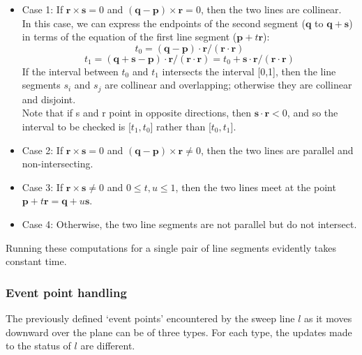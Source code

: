 \documentclass{article}
\begin{document}
\begin{itemize}
    \item Case 1: If $\mathbf{r} \times \mathbf{s} = 0$ and $(\mathbf{q} - \mathbf{p}) \times \mathbf{r} = 0$, then the two lines are collinear.\\
    In this case, we can express the endpoints of the second segment ($\mathbf{q}$ to $\mathbf{q}+\mathbf{s}$) in terms of the equation of the first line segment ($\mathbf{p} + t\mathbf{r}$):
    \begin{equation*}
        t_0 = (\mathbf{q} - \mathbf{p}) \cdot \mathbf{r} / (\mathbf{r} \cdot \mathbf{r})
    \end{equation*}
    \begin{equation*}
        t_1 = (\mathbf{q} + \mathbf{s} - \mathbf{p}) \cdot \mathbf{r} / (\mathbf{r} \cdot \mathbf{r}) = t_0 + \mathbf{s} \cdot \mathbf{r} / (\mathbf{r} \cdot \mathbf{r})
    \end{equation*}
    If the interval between $t_0$ and $t_1$ intersects the interval [0,1], then the line segments $s_i$ and $s_j$ are collinear and overlapping; otherwise they are collinear and disjoint. \\
    Note that if s and r point in opposite directions, then $\mathbf{s} \cdot \mathbf{r} < 0$, and so the interval to be checked is [$t_1,t_0$] rather than [$t_0,t_1$].
    
    \item Case 2: If $\mathbf{r} \times \mathbf{s} = 0$ and $(\mathbf{q} - \mathbf{p}) \times \mathbf{r} \neq 0$, then the two lines are parallel and non-intersecting.
    
    \item Case 3: If $\mathbf{r} \times \mathbf{s} \neq 0$ and $0 \leq t, u \leq 1$, then the two lines meet at the point $\mathbf{p} + t\mathbf{r} = \mathbf{q} + u\mathbf{s}$.
    
    \item Case 4: Otherwise, the two line segments are not parallel but do not intersect.
\end{itemize}

Running these computations for a single pair of line segments evidently takes constant time.

\subsubsection{Event point handling}

The previously defined `event points' encountered by the sweep line $l$ as it moves downward over the plane can be of three types. For each type, the updates made to the status of $l$ are different.
\end{document}

